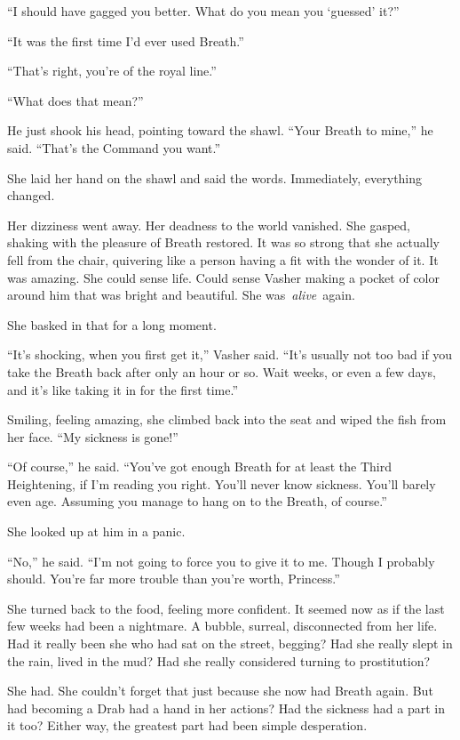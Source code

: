 “I should have gagged you better. What do you mean you ‘guessed’ it?”

“It was the first time I’d ever used Breath.”

“That’s right, you’re of the royal line.”

“What does that mean?”

He just shook his head, pointing toward the shawl. “Your Breath to mine,” he said. “That’s the Command you want.”

She laid her hand on the shawl and said the words. Immediately, everything changed.

Her dizziness went away. Her deadness to the world vanished. She gasped, shaking with the pleasure of Breath restored. It was so strong that she actually fell from the chair, quivering like a person having a fit with the wonder of it. It was amazing. She could sense life. Could sense Vasher making a pocket of color around him that was bright and beautiful. She was~\textit{alive}~again.

She basked in that for a long moment.

“It’s shocking, when you first get it,” Vasher said. “It’s usually not too bad if you take the Breath back after only an hour or so. Wait weeks, or even a few days, and it’s like taking it in for the first time.”

Smiling, feeling amazing, she climbed back into the seat and wiped the fish from her face. “My sickness is gone!”

“Of course,” he said. “You’ve got enough Breath for at least the Third Heightening, if I’m reading you right. You’ll never know sickness. You’ll barely even age. Assuming you manage to hang on to the Breath, of course.”

She looked up at him in a panic.

“No,” he said. “I’m not going to force you to give it to me. Though I probably should. You’re far more trouble than you’re worth, Princess.”

She turned back to the food, feeling more confident. It seemed now as if the last few weeks had been a nightmare. A bubble, surreal, disconnected from her life. Had it really been she who had sat on the street, begging? Had she really slept in the rain, lived in the mud? Had she really considered turning to prostitution?

She had. She couldn’t forget that just because she now had Breath again. But had becoming a Drab had a hand in her actions? Had the sickness had a part in it too? Either way, the greatest part had been simple desperation.


